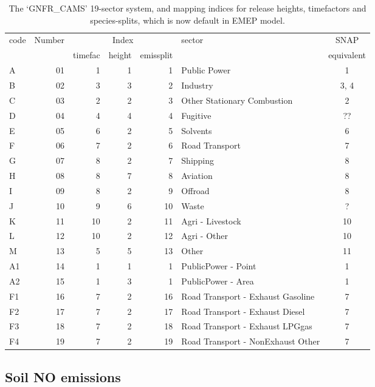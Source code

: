 \begin{table}
\caption{The `GNFR\_CAMS' 19-sector system, and mapping indices for release heights, timefactors and species-splits,
 which is now
 default in EMEP model. \label{tab:GNFRsectors}
}
\begin{tabular}{lrrrrlc}
\hline
code & Number  & \multicolumn{3}{c}{Index}      & sector & SNAP \\ \cline{3-5}
     &         & timefac  & height & emissplit  &        & equivalent \\
\hline
A &      01 &   1 &  1 &   1 &  Public Power  &  1 \\
B &      02 &   3 &  3 &   2 &  Industry  & 3, 4 \\
C &      03 &   2 &  2 &   3 &  Other Stationary Combustion & 2 \\
D &      04 &   4 &  4 &   4 &  Fugitive & ??  \\
E &      05 &   6 &  2 &   5 &  Solvents & 6 \\
F &      06 &   7 &  2 &   6 &  Road Transport & 7 \\
G &      07 &   8 &  2 &   7 &  Shipping & 8  \\
H &      08 &   8 &  7 &   8 &  Aviation & 8  \\
I &      09 &   8 &  2 &   9 &  Offroad & 8  \\
J &     10 &   9 &  6 &  10 &  Waste & ? \\
K &     11 &  10 &  2 &  11 &  Agri - Livestock & 10 \\
L &     12 &  10 &  2 &  12 &  Agri - Other & 10 \\
M &     13 &   5 &  5 &  13 &  Other & 11 \\
A1 &    14 &   1 &  1 &   1 &  PublicPower - Point & 1 \\
A2 &    15 &   1 &  3 &   1 &  PublicPower - Area & 1 \\
F1 &    16 &   7 &  2 &  16 &  Road Transport - Exhaust Gasoline & 7  \\
F2 &    17 &   7 &  2 &  17 &  Road Transport - Exhaust Diesel& 7   \\
F3 &    18 &   7 &  2 &  18 &  Road Transport - Exhaust LPGgas & 7  \\
F4 &    19 &   7 &  2 &  19 &  Road Transport - NonExhaust Other& 7   \\
\hline
\end{tabular}
\end{table}



\subsection{Soil NO emissions}
\label{ssec:soilNO}

